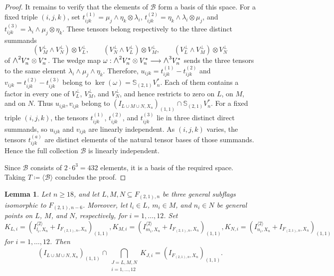 \documentclass[a4paper,reqno]{amsart}
\theoremstyle{plainnopunct}
\newtheorem{lemma}[lemma]{Lemma}
\theoremstyle{definitionnopunct}
\newcommand{\superwedge}{\mathlarger{\mathlarger{\wedge}}}
\renewcommand{\S}{\mathbb{S}}
\begin{document}
\begin{proof}
{It remains to verify that the elements of $\mathcal B$ form a
basis of this space. For a fixed triple $(i,j,k)$, set
$t^{(1)}_{ijk}
=\mu_j\wedge\eta_k\otimes\lambda_i$,
$t^{(2)}_{ijk}
=\eta_k\wedge\lambda_i\otimes\mu_j$, and
$t^{(3)}_{ijk}
=\lambda_i\wedge\mu_j\otimes\eta_k$.
These tensors belong respectively to the three distinct summands
\[
(V_M^\perp\wedge V_N^\perp)\otimes V_L^\perp,
\qquad
(V_N^\perp\wedge V_L^\perp)\otimes V_M^\perp,
\qquad
(V_L^\perp\wedge V_M^\perp)\otimes V_N^\perp
\]
of $\superwedge^2V_n^*\otimes V_n^*$.
}
{
The wedge map
$\omega:\superwedge^2V_n^*\otimes V_n^*
\longrightarrow\superwedge^3V_n^*$
sends the three tensors to the same element
$\lambda_i\wedge\mu_j\wedge\eta_k$. Therefore,
$u_{ijk}=t^{(1)}_{ijk}-t^{(2)}_{ijk}$ and
$v_{ijk}=t^{(2)}_{ijk}-t^{(3)}_{ijk}$ belong to
$\ker(\omega)=\S_{(2,1)}V_n^*$.
}
{
Each of them contains a factor in every one of
$V_L^\perp$, $V_M^\perp$, and $V_N^\perp$, and hence restricts to
zero on $L$, on $M$, and on $N$. Thus
$u_{ijk},v_{ijk}$ belong to
$\left(I_{L\cup M\cup N,X_n}\right)_{(1,1)}
\cap\S_{(2,1)}V_n^*$.
}
{
For a fixed triple $(i,j,k)$, the tensors
$t^{(1)}_{ijk}$, $t^{(2)}_{ijk}$, and $t^{(3)}_{ijk}$ lie in three
distinct direct summands, so $u_{ijk}$ and $v_{ijk}$ are linearly
independent. As $(i,j,k)$ varies, the tensors $t^{(a)}_{ijk}$ are
distinct elements of the natural tensor bases of those summands.
Hence the full collection $\mathcal B$ is linearly independent.}

Since $\mathcal B$ consists of $2\cdot6^3=432$ elements, it is a basis
of the required space. Taking $T\coloneq\langle\mathcal B\rangle$
concludes the proof.
\end{proof}

\begin{lemma}
\label{lemmaLMN}
Let $n\geq18$, and let
$L,M,N\subseteq F_{(2,1),n}$ be three general subflags isomorphic to
$F_{(2,1),n-6}$. Moreover, let
$l_i\in L$, $m_i\in M$, and $n_i\in N$ be general points on
$L$, $M$, and $N$, respectively, for $i=1,\ldots,12$. Set
$$
K_{L,i}
=
\left(
I_{l_i,X_n}^{\langle2\rangle}
+
I_{F_{(2,1),n},X_n}
\right)_{(1,1)},
K_{M,i}
=
\left(
I_{m_i,X_n}^{\langle2\rangle}
+
I_{F_{(2,1),n},X_n}
\right)_{(1,1)},
K_{N,i}
=
\left(
I_{n_i,X_n}^{\langle2\rangle}
+
I_{F_{(2,1),n},X_n}
\right)_{(1,1)}
$$
for $i=1,\ldots,12$. Then
$$
\left(
I_{L\cup M\cup N,X_n}
\right)_{(1,1)}
\cap
\bigcap_{\substack{J=L,M,N\\ i=1,\ldots,12}}
K_{J,i}
=
\left(
I_{F_{(2,1),n},X_n}
\right)_{(1,1)}.
$$
\end{lemma}
\end{document}
